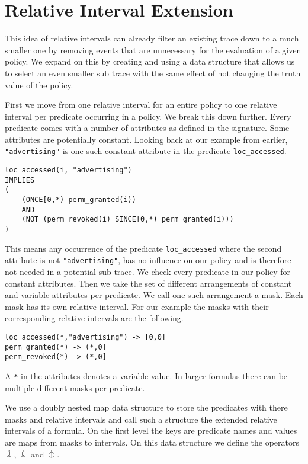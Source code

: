 \section{Relative Interval Extension}

This idea of relative intervals can already filter an existing trace down to a much smaller one by removing events that are unnecessary for the evaluation of a given policy.
We expand on this by creating and using a data structure that allows us to select an even smaller sub trace with the same effect of not changing the truth value of the policy.

First we move from one relative interval for an entire policy to one relative interval per predicate occurring in a policy.
We break this down further.
Every predicate comes with a number of attributes as defined in the signature.
Some attributes are potentially constant.
Looking back at our example from earlier, \texttt{"advertising"} is one such constant attribute in the predicate \texttt{loc\_accessed}.

\begin{verbatim}
loc_accessed(i, "advertising") 
IMPLIES 
(
    (ONCE[0,*) perm_granted(i)) 
    AND 
    (NOT (perm_revoked(i) SINCE[0,*) perm_granted(i)))
)
\end{verbatim}

This means any occurrence of the predicate \texttt{loc\_accessed} where the second attribute is not \texttt{"advertising"}, has no influence on our policy and is therefore not needed in a potential sub trace.
We check every predicate in our policy for constant attributes.
Then we take the set of different arrangements of constant and variable attributes per predicate.
We call one such arrangement a mask.
Each mask has its own relative interval.
For our example the masks with their corresponding relative intervals are the following.

\begin{verbatim}
loc_accessed(*,"advertising") -> [0,0]
perm_granted(*) -> (*,0]
perm_revoked(*) -> (*,0]
\end{verbatim}

A \texttt{*} in the attributes denotes a variable value.
In larger formulas there can be multiple different masks per predicate.

We use a doubly nested map data structure to store the predicates with there masks and relative intervals and call such a structure the extended relative intervals of a formula.
On the first level the keys are predicate names and values are maps from masks to intervals.
On this data structure we define the operators $\,\ddot{\Cup}\,$, $\,\dot{\Cup}\,$ and $\,\dot{\oplus}\,$.


